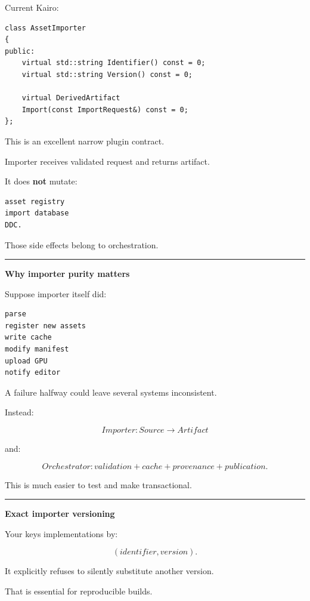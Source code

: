 Current Kairo:

\begin{verbatim}
class AssetImporter
{
public:
    virtual std::string Identifier() const = 0;
    virtual std::string Version() const = 0;

    virtual DerivedArtifact
    Import(const ImportRequest&) const = 0;
};
\end{verbatim}

This is an excellent narrow plugin contract.

Importer receives validated request and returns artifact.

It does \textbf{not} mutate:

\begin{verbatim}
asset registry
import database
DDC.
\end{verbatim}

Those side effects belong to orchestration.

\begin{center}\rule{0.5\linewidth}{0.5pt}\end{center}

\textbf{Why importer purity matters}

Suppose importer itself did:

\begin{verbatim}
parse
register new assets
write cache
modify manifest
upload GPU
notify editor
\end{verbatim}

A failure halfway could leave several systems inconsistent.

Instead:

\[
Importer:
Source\rightarrow Artifact
\]

and:

\[
Orchestrator:
validation + cache + provenance + publication.
\]

This is much easier to test and make transactional.

\begin{center}\rule{0.5\linewidth}{0.5pt}\end{center}

\textbf{Exact importer versioning}

Your  keys implementations by:

\[
(identifier,version).
\]

It explicitly refuses to silently substitute another version.

That is essential for reproducible builds.

